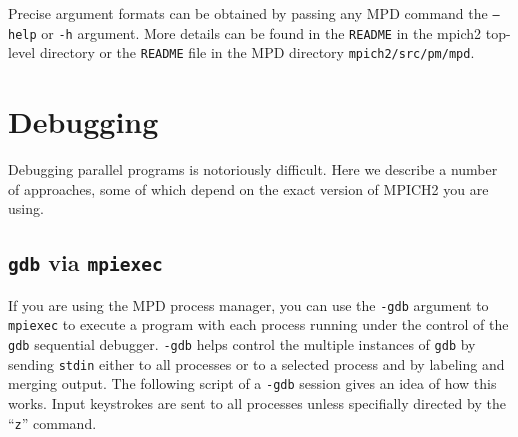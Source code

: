 \documentclass[dvipdfm,11pt]{article}
\begin{document}
Precise argument formats can be obtained by passing any MPD command the
\texttt{--help} or \texttt{-h} argument.  More details can be found in
the \texttt{README} in the mpich2 top-level directory or the
\texttt{README} file in the MPD directory \texttt{mpich2/src/pm/mpd}.


\section{Debugging}
\label{sec:debugging}

Debugging parallel programs is notoriously difficult.  Here we describe
a number of approaches, some of which depend on the exact version of
MPICH2 you are using. 


\subsection{\texttt{gdb} via \texttt{mpiexec}}
\label{sec:gdb via mpiexec}

If you are using the MPD process manager, you can use the
\texttt{-gdb} argument to \texttt{mpiexec} to execute a program with
each process running under the control of the \texttt{gdb} sequential
debugger.  \texttt{-gdb} helps control the multiple instances of
\texttt{gdb} by sending \texttt{stdin} either to all processes or to a
selected process and by labeling and merging output.  The following
script of a \texttt{-gdb} session gives an idea of how this works.
Input keystrokes are sent to all processes unless specifially directed
by the ``\texttt{z}'' command.
\end{document}

